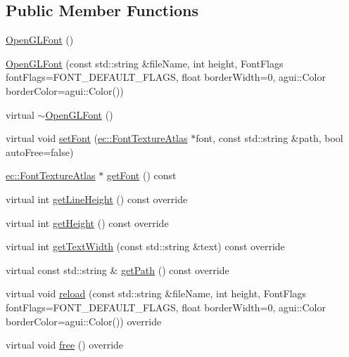 \subsection*{Public Member Functions}
\begin{DoxyCompactItemize}
\item 
\mbox{\hyperlink{classagui_1_1_open_g_l_font_a0b754bbe97e143399be1921c82e614ad}{Open\+G\+L\+Font}} ()
\item 
\mbox{\hyperlink{classagui_1_1_open_g_l_font_acab7213d398235345e1b080a70342d70}{Open\+G\+L\+Font}} (const std\+::string \&file\+Name, int height, Font\+Flags font\+Flags=F\+O\+N\+T\+\_\+\+D\+E\+F\+A\+U\+L\+T\+\_\+\+F\+L\+A\+GS, float border\+Width=0, agui\+::\+Color border\+Color=agui\+::\+Color())
\item 
virtual \mbox{\hyperlink{classagui_1_1_open_g_l_font_a95748442760ccc598955f8f625fd3c18}{$\sim$\+Open\+G\+L\+Font}} ()
\item 
virtual void \mbox{\hyperlink{classagui_1_1_open_g_l_font_a0b8b5c5bd6a8cda3767a3215c48a2e01}{set\+Font}} (\mbox{\hyperlink{classec_1_1_font_texture_atlas}{ec\+::\+Font\+Texture\+Atlas}} $\ast$font, const std\+::string \&path, bool auto\+Free=false)
\item 
\mbox{\hyperlink{classec_1_1_font_texture_atlas}{ec\+::\+Font\+Texture\+Atlas}} $\ast$ \mbox{\hyperlink{classagui_1_1_open_g_l_font_aff4269a2b0fd00f32e4aa1275efcf2d7}{get\+Font}} () const
\item 
virtual int \mbox{\hyperlink{classagui_1_1_open_g_l_font_ac1bdd9a5a712e57bf4b1507e9d4e09fd}{get\+Line\+Height}} () const override
\item 
virtual int \mbox{\hyperlink{classagui_1_1_open_g_l_font_a68c2a62f030db8afb04ecb237764d5d9}{get\+Height}} () const override
\item 
virtual int \mbox{\hyperlink{classagui_1_1_open_g_l_font_a5cee06ae51d416cfb2997aa1ac7177ac}{get\+Text\+Width}} (const std\+::string \&text) const override
\item 
virtual const std\+::string \& \mbox{\hyperlink{classagui_1_1_open_g_l_font_aa5cbdbe35356cb5152de307247e5c84c}{get\+Path}} () const override
\item 
virtual void \mbox{\hyperlink{classagui_1_1_open_g_l_font_a6361880d5d7cf07935d548b77c2d354b}{reload}} (const std\+::string \&file\+Name, int height, Font\+Flags font\+Flags=F\+O\+N\+T\+\_\+\+D\+E\+F\+A\+U\+L\+T\+\_\+\+F\+L\+A\+GS, float border\+Width=0, agui\+::\+Color border\+Color=agui\+::\+Color()) override
\item 
virtual void \mbox{\hyperlink{classagui_1_1_open_g_l_font_a56fba80e7edec09dc3efc67570c7aca0}{free}} () override
\end{DoxyCompactItemize}


